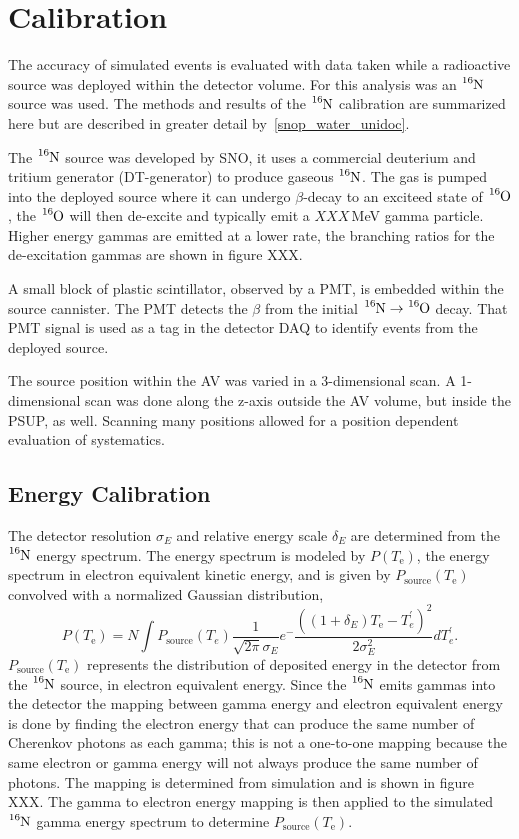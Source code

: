 \section{Calibration}
\label{sec:calib}
The accuracy of simulated events is evaluated with data taken while a
radioactive source was deployed within the detector volume.
For this analysis was an $\ce{^{16}N}$ source was used.
The methods and results of the $\ce{^{16}N}$ calibration are summarized here but
are described in greater detail by~\ref{snop_water_unidoc}.

The $\ce{^{16}N}$ source was developed by SNO, it uses a commercial
deuterium and tritium generator (DT-generator) to produce gaseous $\ce{^{16}N}$.
The gas is pumped into the deployed source where it can undergo $\beta$-decay
to an exciteed state of $\ce{^{16}O}$, the $\ce{^{16}O}$ will then de-excite
and typically emit a $XXX$\,MeV gamma particle. Higher energy gammas are emitted
at a lower rate, the branching ratios for the de-excitation gammas are shown in
figure XXX.\@

A small block of plastic scintillator, observed by a PMT, is embedded within the
source cannister. The PMT detects the $\beta$ from the initial
$\ce{^{16}N} \rightarrow \ce{^{16}O}$ decay. That PMT signal is used as a
tag in the detector DAQ to identify events from the deployed source.

The source position within the AV was varied in a 3-dimensional
scan.
A 1-dimensional scan was done along the z-axis outside the AV volume,
but inside the PSUP, as well.
Scanning many positions allowed for a position dependent evaluation of
systematics.

\subsection{Energy Calibration}
The detector resolution $\sigma_{E}$ and relative energy scale $\delta_{E}$ are determined
from the $\ce{^{16}N}$ energy spectrum.
The energy spectrum is modeled by $P(T_\mathrm{e})$, the energy spectrum in
electron equivalent kinetic energy, and is given by $P_{\mathrm{source}}(T_{\mathrm{e}})$
convolved with a normalized Gaussian distribution,
\begin{equation}
    P(T_\mathrm{e}) = N \int P_\mathrm{source}(T_{e})\frac{1}{\sqrt{2\pi}\sigma_{E}}e^-{\frac{\left((1+\delta_E)T_\mathrm{e}-T^{\prime}_{e}\right)^{2}}{2\sigma^{2}_{E}}}dT^{\prime}_{e}\text{.}%
\label{eq:convolution}
\end{equation}
$P_\mathrm{source}(T_{\mathrm{e}})$ represents the distribution of deposited energy in
the detector from the $\ce{^{16}N}$ source, in electron equivalent energy.
Since the $\ce{^{16}N}$ emits gammas into the detector the mapping between
gamma energy and electron equivalent energy is done by finding the electron
energy that can produce the same number of Cherenkov photons
as each gamma; this is not a one-to-one mapping because the same electron or gamma
energy will not always produce the same number of photons.
The mapping is determined from simulation and is shown in
figure XXX.
The gamma to electron energy mapping is then applied to the simulated $\ce{^{16}N}$
gamma energy spectrum to determine $P_\mathrm{source}(T_{\mathrm{e}})$.


